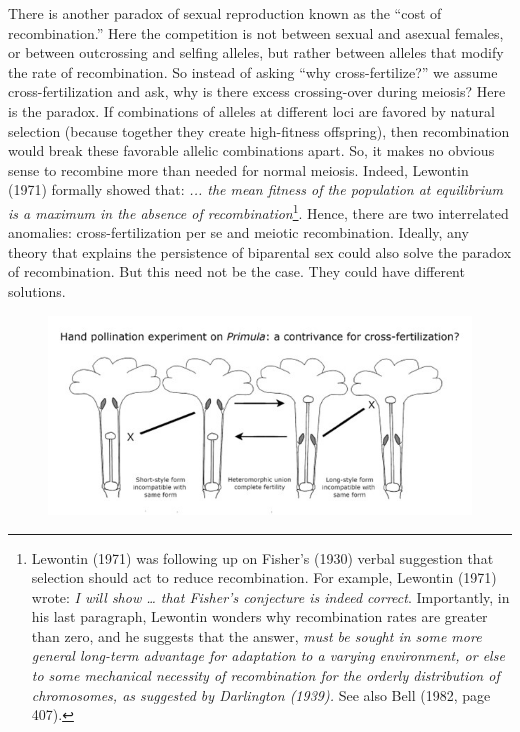 \documentclass[
  letterpaper,
]{book}
\begin{document}
There is another paradox of sexual reproduction known as the ``cost of
recombination.'' Here the competition is not between sexual and asexual
females, or between outcrossing and selfing alleles, but rather between
alleles that modify the rate of recombination. So instead of asking
``why cross-fertilize?'' we assume cross-fertilization and ask, why is
there excess crossing-over during meiosis? Here is the paradox. If
combinations of alleles at different loci are favored by natural
selection (because together they create high-fitness offspring), then
recombination would break these favorable allelic combinations apart.
So, it makes no obvious sense to recombine more than needed for normal
meiosis. Indeed, Lewontin (1971) formally showed that: \emph{... the
mean fitness of the population at equilibrium is a maximum in the
absence of recombination}\footnote{Lewontin (1971) was following up on
  Fisher's (1930) verbal suggestion that selection should act to reduce
  recombination. For example, Lewontin (1971) wrote: \emph{I will show
  \ldots{} that Fisher's conjecture is indeed correct}. Importantly, in
  his last paragraph, Lewontin wonders why recombination rates are
  greater than zero, and he suggests that the answer, \emph{must be
  sought in some more general long-term advantage for adaptation to a
  varying environment, or else to some mechanical necessity of
  recombination for the orderly distribution of chromosomes, as
  suggested by Darlington (1939).} See also Bell (1982, page 407).}.
Hence, there are two interrelated anomalies: cross-fertilization per se
and meiotic recombination. Ideally, any theory that explains the
persistence of biparental sex could also solve the paradox of
recombination. But this need not be the case. They could have different
solutions.

\begin{figure}


{\centering \includegraphics{images/fig1-3.jpg}

}

\end{figure}
\end{document}
